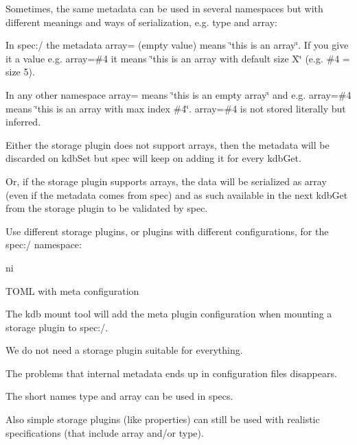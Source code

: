 Sometimes, the same metadata can be used in several namespaces but with different meanings and ways of serialization, e.\+g. {\ttfamily type} and {\ttfamily array}\+:


\begin{DoxyItemize}
\item In {\ttfamily spec\+:/} the metadata {\ttfamily array=} (empty value) means \char`\"{}this is an array\char`\"{}. If you give it a value e.\+g. {\ttfamily array=\#4} it means \char`\"{}this is an array with default size X\char`\"{} (e.\+g. {\ttfamily \#4} = size 5).
\item In any other namespace {\ttfamily array=} means \char`\"{}this is an empty array\char`\"{} and e.\+g. {\ttfamily array=\#4} means \char`\"{}this is an array with max index \#4\char`\"{}. {\ttfamily array=\#4} is not stored literally but inferred.
\item Either the storage plugin does not support arrays, then the metadata will be discarded on {\ttfamily kdb\+Set} but {\ttfamily spec} will keep on adding it for every {\ttfamily kdb\+Get}.
\item Or, if the storage plugin supports arrays, the data will be serialized as array (even if the metadata comes from {\ttfamily spec}) and as such available in the next {\ttfamily kdb\+Get} from the storage plugin to be validated by {\ttfamily spec}.
\end{DoxyItemize}

Use different storage plugins, or plugins with different configurations, for the {\ttfamily spec\+:/} namespace\+:


\begin{DoxyItemize}
\item {\ttfamily ni}
\item T\+O\+ML with {\ttfamily meta} configuration
\end{DoxyItemize}

The {\ttfamily kdb mount} tool will add the {\ttfamily meta} plugin configuration when mounting a storage plugin to {\ttfamily spec\+:/}.


\begin{DoxyItemize}
\item We do not need a storage plugin suitable for everything.
\item The problems that internal metadata ends up in configuration files disappears.
\item The short names {\ttfamily type} and {\ttfamily array} can be used in specs.
\item Also simple storage plugins (like properties) can still be used with realistic specifications (that include array and/or type).
\end{DoxyItemize}


